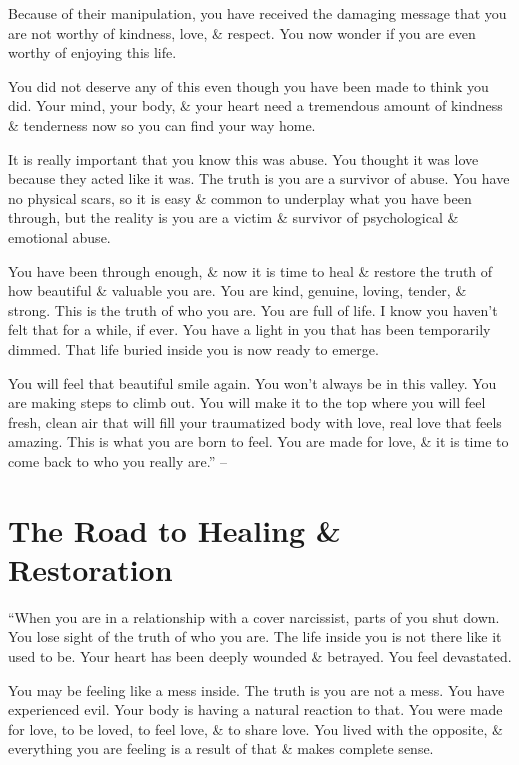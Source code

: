\documentclass{article}
\numberwithin{equation}{section}
\begin{document}
Because of their manipulation, you have received the damaging message that you are not worthy of kindness, love, \& respect. You now wonder if you are even worthy of enjoying this life.

You did not deserve any of this even though you have been made to think you did. Your mind, your body, \& your heart need a tremendous amount of kindness \& tenderness now so you can find your way home.

It is really important that you know this was abuse. You thought it was love because they acted like it was. The truth is you are a survivor of abuse. You have no physical scars, so it is easy \& common to underplay what you have been through, but the reality is you are a victim \& survivor of psychological \& emotional abuse.

You have been through enough, \& now it is time to heal \& restore the truth of how beautiful \& valuable you are. You are kind, genuine, loving, tender, \& strong. This is the truth of who you are. You are full of life. I know you haven't felt that for a while, if ever. You have a light in you that has been temporarily dimmed. That life buried inside you is now ready to emerge.

You will feel that beautiful smile again. You won't always be in this valley. You are making steps to climb out. You will make it to the top where you will feel fresh, clean air that will fill your traumatized body with love, real love that feels amazing. This is what you are born to feel. You are made for love, \& it is time to come back to who you really are.'' -- \cite[pp. 145--148]{Mirza2017}


\section{The Road to Healing \& Restoration}
``When you are in a relationship with a cover narcissist, parts of you shut down. You lose sight of the truth of who you are. The life inside you is not there like it used to be. Your heart has been deeply wounded \& betrayed. You feel devastated.

You may be feeling like a mess inside. The truth is you are not a mess. You have experienced evil. Your body is having a natural reaction to that. You were made for love, to be loved, to feel love, \& to share love. You lived with the opposite, \& everything you are feeling is a result of that \& makes complete sense.
\end{document}
